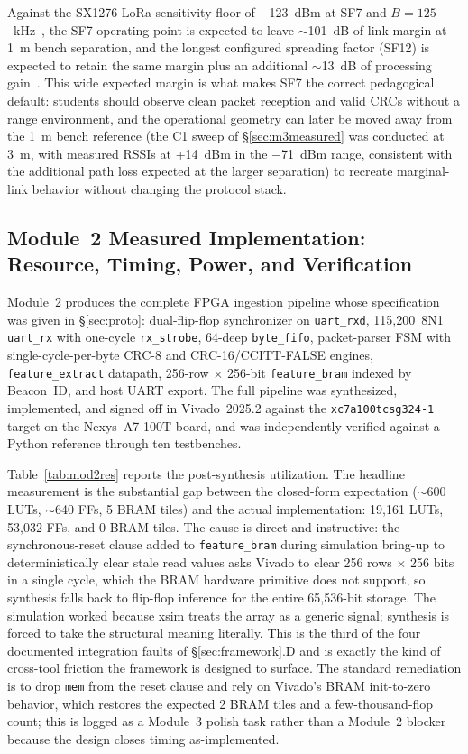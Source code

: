 \documentclass[conference]{IEEEtran}
\begin{document}
Against the SX1276 LoRa sensitivity floor of $-$123~dBm at SF7 and $B=125$~kHz~\cite{b12}, the SF7 operating point is expected to leave $\sim$101~dB of link margin at 1~m bench separation, and the longest configured spreading factor (SF12) is expected to retain the same margin plus an additional $\sim$13~dB of processing gain~\cite{b5,b12}. This wide expected margin is what makes SF7 the correct pedagogical default: students should observe clean packet reception and valid CRCs without a range environment, and the operational geometry can later be moved away from the 1~m bench reference (the C1 sweep of \S\ref{sec:m3measured} was conducted at 3~m, with measured RSSIs at +14~dBm in the $-$71~dBm range, consistent with the additional path loss expected at the larger separation) to recreate marginal-link behavior without changing the protocol stack.

\subsection{Module~2 Measured Implementation: Resource, Timing, Power, and Verification}\label{sec:m2measured}

Module~2 produces the complete FPGA ingestion pipeline whose specification was given in \S\ref{sec:proto}: dual-flip-flop synchronizer on \texttt{uart\_rxd}, 115{,}200~8N1 \texttt{uart\_rx} with one-cycle \texttt{rx\_strobe}, 64-deep \texttt{byte\_fifo}, packet-parser FSM with single-cycle-per-byte CRC-8 and CRC-16/CCITT-FALSE engines, \texttt{feature\_extract} datapath, 256-row $\times$ 256-bit \texttt{feature\_bram} indexed by Beacon~ID, and host UART export. The full pipeline was synthesized, implemented, and signed off in Vivado~2025.2 against the \texttt{xc7a100tcsg324-1} target on the Nexys~A7-100T board, and was independently verified against a Python reference through ten testbenches.

Table~\ref{tab:mod2res} reports the post-synthesis utilization. The headline measurement is the substantial gap between the closed-form expectation ($\sim$600 LUTs, $\sim$640 FFs, 5 BRAM tiles) and the actual implementation: 19{,}161 LUTs, 53{,}032 FFs, and 0 BRAM tiles. The cause is direct and instructive: the synchronous-reset clause added to \texttt{feature\_bram} during simulation bring-up to deterministically clear stale read values asks Vivado to clear 256 rows $\times$ 256 bits in a single cycle, which the BRAM hardware primitive does not support, so synthesis falls back to flip-flop inference for the entire 65{,}536-bit storage. The simulation worked because xsim treats the array as a generic signal; synthesis is forced to take the structural meaning literally. This is the third of the four documented integration faults of \S\ref{sec:framework}.D and is exactly the kind of cross-tool friction the framework is designed to surface. The standard remediation is to drop \texttt{mem} from the reset clause and rely on Vivado's BRAM init-to-zero behavior, which restores the expected 2 BRAM tiles and a few-thousand-flop count; this is logged as a Module~3 polish task rather than a Module~2 blocker because the design closes timing as-implemented.
\end{document}
